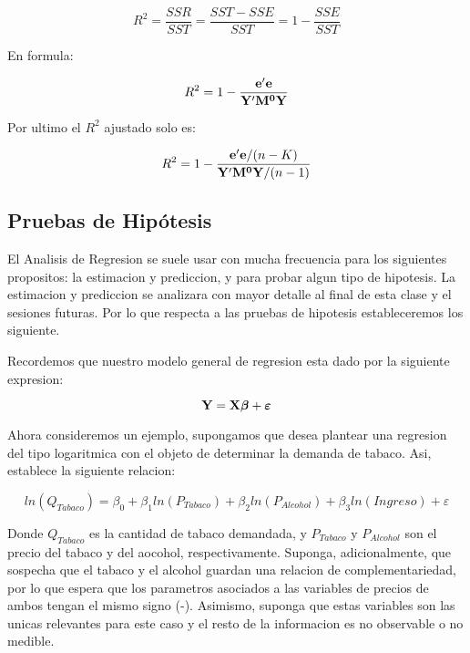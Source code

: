 \documentclass[
  a4paper,
]{article}
\begin{document}
\[R^2 = \frac{SSR}{SST} = \frac{SST - SSE}{SST} = 1 - \frac{SSE}{SST}\]

En f\textquotesingle ormula:

\[R^2 = 1 - \frac{\bf{e'e}}{\bf{Y'M^0Y}}\]

Por \textquotesingle ultimo el \(R^2\) ajustado solo es:

\[R^2 = 1 - \frac{{\bf{e'e}}/(n-K)}{{\bf{Y'M^0Y}}/(n-1)}\]

\hypertarget{pruebas-de-hipuxf3tesis}{%
\subsection{Pruebas de Hipótesis}\label{pruebas-de-hipuxf3tesis}}

El An\textquotesingle alisis de Regresi\textquotesingle on se suele usar
con mucha frecuencia para los siguientes prop\textquotesingle ositos: la
estimaci\textquotesingle on y predicci\textquotesingle on, y para probar
alg\textquotesingle un tipo de hip\textquotesingle otesis. La
estimaci\textquotesingle on y predicci\textquotesingle on se
analizar\textquotesingle a con mayor detalle al final de esta clase y el
sesiones futuras. Por lo que respecta a las pruebas de
hip\textquotesingle otesis estableceremos los siguiente.

Recordemos que nuestro modelo general de regresi\textquotesingle on
est\textquotesingle a dado por la siguiente expresi\textquotesingle on:

\[{\bf Y} = {\bf X}{\boldsymbol \beta} + {\boldsymbol \varepsilon}\]

Ahora consideremos un ejemplo, supongamos que desea plantear una
regresi\textquotesingle on del tipo logar\textquotesingle itmica con el
objeto de determinar la demanda de tabaco. As\textquotesingle i,
establece la siguiente relaci\textquotesingle on:

\[ln(Q_{Tabaco}) = \beta_0 + \beta_1 ln(P_{Tabaco}) + \beta_2 ln(P_{Alcohol}) + \beta_3 ln(Ingreso) + \varepsilon\]

Donde \(Q_{Tabaco}\) es la cantidad de tabaco demandada, y
\(P_{Tabaco}\) y \(P_{Alcohol}\) son el precio del tabaco y del aocohol,
respectivamente. Suponga, adicionalmente, que sospecha que el tabaco y
el alcohol guardan una relaci\textquotesingle on de complementariedad,
por lo que espera que los param\textquotesingle etros asociados a las
variables de precios de ambos tengan el mismo signo (-). Asimismo,
suponga que estas variables son las \textquotesingle unicas relevantes
para este caso y el resto de la informaci\textquotesingle on es no
observable o no medible.
\end{document}

